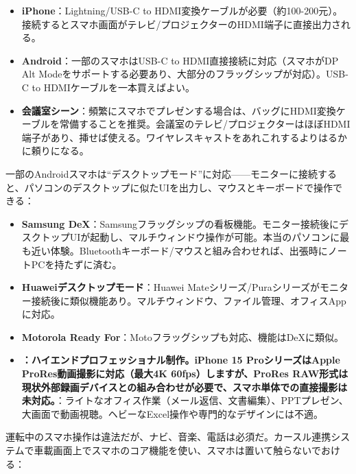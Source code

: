 \begin{itemize}
  \item \textbf{iPhone}：Lightning/USB-C to HDMI変換ケーブルが必要（約100-200元）。接続するとスマホ画面がテレビ/プロジェクターのHDMI端子に直接出力される。
  \item \textbf{Android}：一部のスマホはUSB-C to HDMI直接接続に対応（スマホがDP Alt Modeをサポートする必要あり、大部分のフラッグシップが対応）。USB-C to HDMIケーブルを一本買えばよい。
  \item \textbf{会議室シーン}：頻繁にスマホでプレゼンする場合は、バッグにHDMI変換ケーブルを常備することを推奨。会議室のテレビ/プロジェクターはほぼHDMI端子があり、挿せば使える。ワイヤレスキャストをあれこれするよりはるかに頼りになる。
\end{itemize}


一部のAndroidスマホは“デスクトップモード”に対応——モニターに接続すると、パソコンのデスクトップに似たUIを出力し、マウスとキーボードで操作できる：

\begin{itemize}
  \item \textbf{Samsung DeX}：Samsungフラッグシップの看板機能。モニター接続後にデスクトップUIが起動し、マルチウィンドウ操作が可能。本当のパソコンに最も近い体験。Bluetoothキーボード/マウスと組み合わせれば、出張時にノートPCを持たずに済む。
  \item \textbf{Huaweiデスクトップモード}：Huawei Mateシリーズ/Puraシリーズがモニター接続後に類似機能あり。マルチウィンドウ、ファイル管理、オフィスAppに対応。
  \item \textbf{Motorola Ready For}：Motoフラッグシップも対応、機能はDeXに類似。
  \item \textbf{：ハイエンドプロフェッショナル制作。iPhone 15 ProシリーズはApple ProRes動画撮影に対応（最大4K 60fps）しますが、ProRes RAW形式は現状外部録画デバイスとの組み合わせが必要で、スマホ単体での直接撮影は未対応。}：ライトなオフィス作業（メール返信、文書編集）、PPTプレゼン、大画面で動画視聴。ヘビーなExcel操作や専門的なデザインには不適。
\end{itemize}


運転中のスマホ操作は違法だが、ナビ、音楽、電話は必須だ。カースル連携システムで車載画面上でスマホのコア機能を使い、スマホは置いて触らないでおける：

